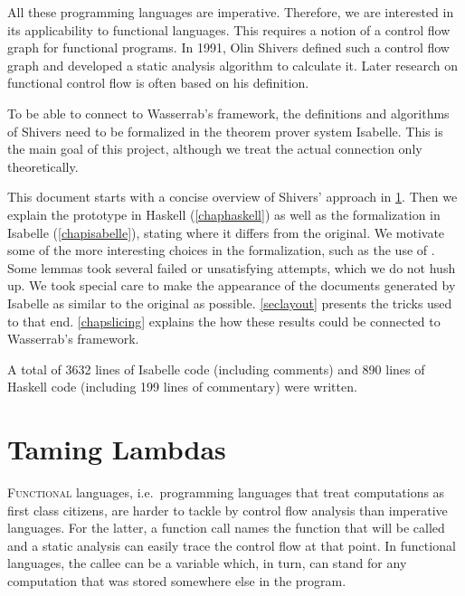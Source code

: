 \documentclass[a4paper,parskip=half,BCOR=8mm,DIV=calc,12pt]{scrbook}
\begin{document}
All these programming languages are imperative. Therefore, we are interested in its applicability to functional languages. This requires a notion of a control flow graph for functional programs. In 1991, Olin Shivers defined such a control flow graph and developed a static analysis algorithm to calculate it. Later research on functional control flow is often based on his definition.

To be able to connect to Wasserrab’s framework, the definitions and algorithms of Shivers need to be formalized in the theorem prover system Isabelle. This is the main goal of this project, although we treat the actual connection only theoretically.

This document starts with a concise overview of Shivers’ approach in \cref{chapshivers}. Then we explain the prototype in Haskell (\cref{chaphaskell}) as well as the formalization in Isabelle (\cref{chapisabelle}), stating where it differs from the original. We motivate some of the more interesting choices in the formalization, such as the use of . Some lemmas took several failed or unsatisfying attempts, which we do not hush up. We took special care to make the appearance of the documents generated by Isabelle as similar to the original as possible. \cref{seclayout} presents the tricks used to that end. \cref{chapslicing} explains the how these results could be connected to Wasserrab’s framework.

\enlargethispage{2em}
A total of 3632 lines of Isabelle code (including comments) and 890 lines of Haskell code (including 199 lines of commentary) were written.


% 

\chapter{Taming Lambdas}
\label{chapshivers}

\lettrine F{unctional} languages, i.e.\ programming languages that treat computations as first class citizens, are harder to tackle by control flow analysis than imperative languages. For the latter, a function call names the function that will be called and a static analysis can easily trace the control flow at that point. In functional languages, the callee can be a variable which, in turn, can stand for any computation that was stored somewhere else in the program.
\end{document}
